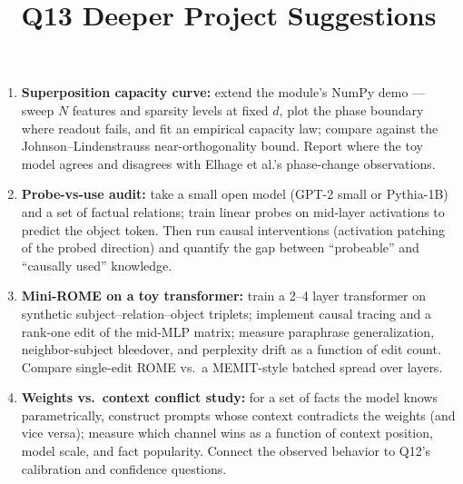 \documentclass[11pt]{article}
\title{Q13 Deeper Project Suggestions}
\date{}
\begin{document}
\maketitle
\begin{enumerate}[noitemsep]
\item \textbf{Superposition capacity curve:} extend the module's NumPy demo --- sweep $N$ features and sparsity levels at fixed $d$, plot the phase boundary where readout fails, and fit an empirical capacity law; compare against the Johnson--Lindenstrauss near-orthogonality bound. Report where the toy model agrees and disagrees with Elhage et al.'s phase-change observations.
\item \textbf{Probe-vs-use audit:} take a small open model (GPT-2 small or Pythia-1B) and a set of factual relations; train linear probes on mid-layer activations to predict the object token. Then run causal interventions (activation patching of the probed direction) and quantify the gap between ``probeable'' and ``causally used'' knowledge.
\item \textbf{Mini-ROME on a toy transformer:} train a 2--4 layer transformer on synthetic subject--relation--object triplets; implement causal tracing and a rank-one edit of the mid-MLP matrix; measure paraphrase generalization, neighbor-subject bleedover, and perplexity drift as a function of edit count. Compare single-edit ROME vs.\ a MEMIT-style batched spread over layers.
\item \textbf{Weights vs.\ context conflict study:} for a set of facts the model knows parametrically, construct prompts whose context contradicts the weights (and vice versa); measure which channel wins as a function of context position, model scale, and fact popularity. Connect the observed behavior to Q12's calibration and confidence questions.
\end{enumerate}
\end{document}

